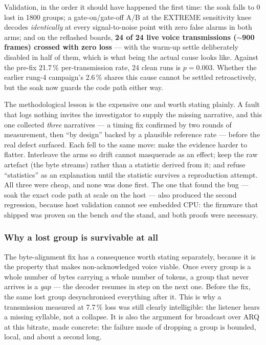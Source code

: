 Validation, in the order it should have happened the first time: the
soak falls to 0 lost in 1800 groups; a gate-on/gate-off A/B at the
EXTREME sensitivity knee decodes \emph{identically} at every
signal-to-noise point with zero false alarms in both arms; and on the
reflashed boards, \textbf{24 of 24 live voice transmissions
($\sim$900 frames) crossed with zero loss} --- with the warm-up settle
deliberately disabled in half of them, which is what being the actual
cause looks like.  Against the pre-fix 21.7\,\% per-transmission rate,
24 clean runs is $p = 0.003$.  Whether the earlier rung-4 campaign's
2.6\,\% shares this cause cannot be settled retroactively, but the
soak now guards the code path either way.

The methodological lesson is the expensive one and worth stating
plainly.  A fault that logs nothing invites the investigator to supply
the missing narrative, and this one collected \emph{three} narratives
--- a timing fix confirmed by two rounds of measurement, then ``by
design'' backed by a plausible reference rate --- before the real
defect surfaced.  Each fell to the same move: make the evidence harder
to flatter.  Interleave the arms so drift cannot masquerade as an
effect; keep the raw artefact (the byte streams) rather than a
statistic derived from it; and refuse ``statistics'' as an explanation
until the statistic survives a reproduction attempt.  All three were
cheap, and none was done first.  The one that found the bug --- soak
the exact code path at scale on the host --- also produced the second
regression, because host validation cannot see embedded CPU: the
firmware that shipped was proven on the bench \emph{and} the stand,
and both proofs were necessary.

\subsubsection{Why a lost group is survivable at all}
The byte-alignment fix has a consequence worth stating separately,
because it is the property that makes non-acknowledged voice viable.
Once every group is a whole number of bytes carrying a whole number of
tokens, a group that never arrives is a \emph{gap} --- the decoder
resumes in step on the next one.  Before the fix, the same lost group
desynchronised everything after it.  This is why a transmission
measured at 7.7\,\% loss was still clearly intelligible: the listener
hears a missing syllable, not a collapse.  It is also the argument for
broadcast over ARQ at this bitrate, made concrete: the failure mode of
dropping a group is bounded, local, and about a second long.

